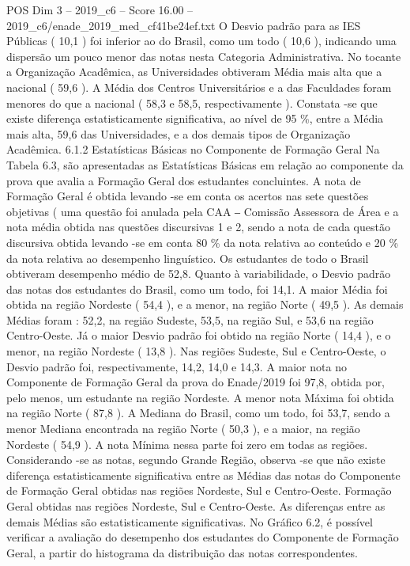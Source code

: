 \begin{textsample}{POS Dim 3 – 2019\_c6 – Score 16.00 – 2019\_c6/enade\_2019\_med\_cf41be24ef.txt}
O Desvio padrão para as IES Públicas ( 10,1 ) foi inferior ao do Brasil, como um todo ( 10,6 ), indicando uma dispersão um pouco menor das notas nesta Categoria Administrativa.
No tocante a Organização Acadêmica, as Universidades obtiveram Média mais alta que a nacional ( 59,6 ).
A Média dos Centros Universitários e a das Faculdades foram menores do que a nacional ( 58,3 e 58,5, respectivamente ).
Constata -se que existe diferença estatisticamente significativa, ao nível de 95 \%, entre a Média mais alta, 59,6 das Universidades, e a dos demais tipos de Organização Acadêmica. 6.1.2 Estatísticas Básicas no Componente de Formação Geral Na Tabela 6.3, são apresentadas as Estatísticas Básicas em relação ao componente da prova que avalia a Formação Geral dos estudantes concluintes.
A nota de Formação Geral é obtida levando -se em conta os acertos nas sete questões objetivas ( uma questão foi anulada pela CAA ‒ Comissão Assessora de Área e a nota média obtida nas questões discursivas 1 e 2, sendo a nota de cada questão discursiva obtida levando -se em conta 80 \% da nota relativa ao conteúdo e 20 \% da nota relativa ao desempenho linguístico.
Os estudantes de todo o Brasil obtiveram desempenho médio de 52,8.
Quanto à variabilidade, o Desvio padrão das notas dos estudantes do Brasil, como um todo, foi 14,1.
A maior Média foi obtida na região Nordeste ( 54,4 ), e a menor, na região Norte ( 49,5 ).
As demais Médias foram : 52,2, na região Sudeste, 53,5, na região Sul, e 53,6 na região Centro-Oeste.
Já o maior Desvio padrão foi obtido na região Norte ( 14,4 ), e o menor, na região Nordeste ( 13,8 ).
Nas regiões Sudeste, Sul e Centro-Oeste, o Desvio padrão foi, respectivamente, 14,2, 14,0 e 14,3.
A maior nota no Componente de Formação Geral da prova do Enade/2019 foi 97,8, obtida por, pelo menos, um estudante na região Nordeste.
A menor nota Máxima foi obtida na região Norte ( 87,8 ).
A Mediana do Brasil, como um todo, foi 53,7, sendo a menor Mediana encontrada na região Norte ( 50,3 ), e a maior, na região Nordeste ( 54,9 ).
A nota Mínima nessa parte foi zero em todas as regiões.
Considerando -se as notas, segundo Grande Região, observa -se que não existe diferença estatisticamente significativa entre as Médias das notas do Componente de Formação Geral obtidas nas regiões Nordeste, Sul e Centro-Oeste.
Formação Geral obtidas nas regiões Nordeste, Sul e Centro-Oeste.
As diferenças entre as demais Médias são estatisticamente significativas.
No Gráfico 6.2, é possível verificar a avaliação do desempenho dos estudantes do Componente de Formação Geral, a partir do histograma da distribuição das notas correspondentes.

\end{textsample}

